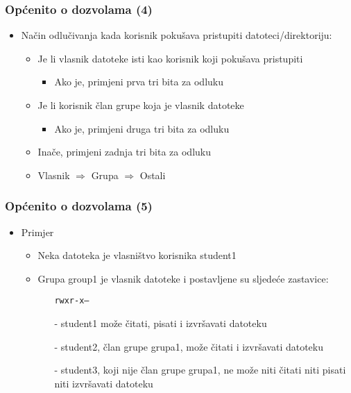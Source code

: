 \documentclass[table,usenames,dvipsnames]{beamer}
\newcommand{\shell}[1]{\texttt{#1}}
\begin{document}
\begin{frame}[t]
\frametitle{Općenito o dozvolama (4)}
\begin{itemize}
  \item Način odlučivanja kada korisnik pokušava pristupiti 
        datoteci/direktoriju:
  \begin{itemize}
    \item Je li vlasnik datoteke isti kao korisnik koji pokušava pristupiti
    \begin{itemize}
      \item Ako je, primjeni prva tri bita za odluku
    \end{itemize}
    \item Je li korisnik član grupe koja je vlasnik datoteke
    \begin{itemize}
      \item Ako je, primjeni druga tri bita za odluku
    \end{itemize}
    \item Inače, primjeni zadnja tri bita za odluku
    \item Vlasnik $\Rightarrow$ Grupa $\Rightarrow$ Ostali
  \end{itemize}
\end{itemize}
\end{frame}

\begin{frame}[t]
\frametitle{Općenito o dozvolama (5)}
\begin{itemize}
  \item Primjer
  \begin{itemize}
    \item Neka datoteka je vlasništvo korisnika student1
    \item Grupa group1 je vlasnik datoteke i postavljene su sljedeće 
          zastavice:
    \begin{itemize}
      \item[] \shell{rwxr-x---}
      \item[-] student1 može čitati, pisati i izvršavati datoteku 
      \item[-] student2, član grupe grupa1, može čitati i izvršavati 
               datoteku
      \item[-] student3, koji nije član grupe grupa1, ne može niti čitati 
               niti pisati niti izvršavati datoteku
    \end{itemize}
  \end{itemize}
\end{itemize}
\end{frame}
\end{document}
